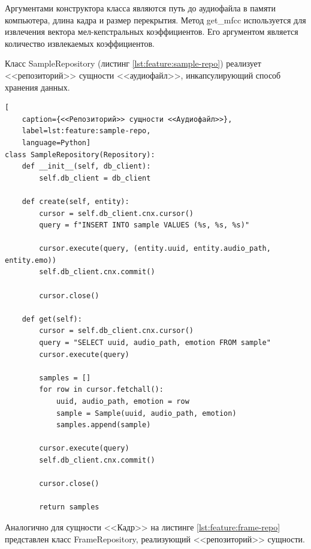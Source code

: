 Аргументами конструктора класса являются путь до аудиофайла в памяти компьютера, длина кадра и размер перекрытия. Метод get\_mfcc используется для извлечения вектора мел-кепстральных коэффициентов. Его аргументом является количество извлекаемых коэффициентов.

Класс SampleRepository (листинг \ref{lst:feature:sample-repo}) реализует <<репозиторий>> сущности <<аудиофайл>>, инкапсулирующий способ хранения данных.
\begin{lstlisting}[
	caption={<<Репозиторий>> сущности <<Аудиофайл>>},
	label=lst:feature:sample-repo,
	language=Python]
class SampleRepository(Repository):
    def __init__(self, db_client):
        self.db_client = db_client

    def create(self, entity):
        cursor = self.db_client.cnx.cursor()
        query = f"INSERT INTO sample VALUES (%s, %s, %s)"
        
        cursor.execute(query, (entity.uuid, entity.audio_path, entity.emo))
        self.db_client.cnx.commit()
        
        cursor.close()

    def get(self):
        cursor = self.db_client.cnx.cursor()
        query = "SELECT uuid, audio_path, emotion FROM sample"
        cursor.execute(query)

        samples = []
        for row in cursor.fetchall():
            uuid, audio_path, emotion = row
            sample = Sample(uuid, audio_path, emotion)
            samples.append(sample)

        cursor.execute(query)
        self.db_client.cnx.commit()
        
        cursor.close()

        return samples
\end{lstlisting}
Аналогично для сущности <<Кадр>> на листинге \ref{lst:feature:frame-repo} представлен класс FrameRepository, реализующий <<репозиторий>> сущности.
